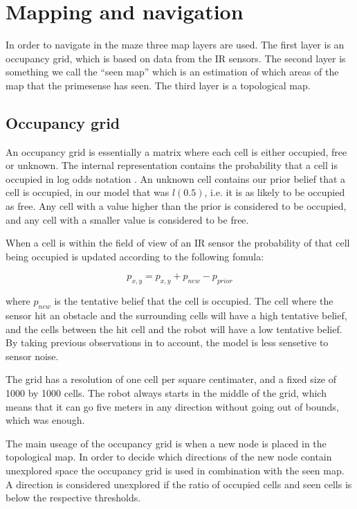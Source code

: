 \section{Mapping and navigation}
In order to navigate in the maze three map layers are used. The first layer is an occupancy grid, which is based on data from the IR sensors. The second layer is something we call the ``seen map'' which is an estimation of which areas of the map that the primesense has seen. The third layer is a topological map.

\subsection{Occupancy grid}
An occupancy grid is essentially a matrix where each cell is either occupied, free or unknown. 
The internal representation contains the probability that a cell is occupied in log odds notation \cite{wiki:Logit}.
An unknown cell contains our prior belief that a cell is occupied, in our model that was $l(0.5)$, i.e. it is as likely to be occupied as free.  
Any cell with a value higher than the prior is considered to be occupied, and any cell with a smaller value is considered to be free.

When a cell is within the field of view of an IR sensor the probability of that cell being occupied is updated according to the following fomula:

\begin{equation}
p_{x, y} = p_{x, y} + p_{new} - p_{prior}
\end{equation}

where $p_{new}$ is the tentative belief that the cell is occupied. The cell where the sensor hit an obstacle and the surrounding cells will have a high tentative belief, and the cells between the hit cell and the robot will have a low tentative belief. By taking previous observations in to account, the model is less sensetive to sensor noise. \cite{GridLecture}

The grid has a resolution of one cell per square centimater, and a fixed size of 1000 by 1000 cells. 
The robot always starts in the middle of the grid, which means that it can go five meters in any direction without going out of bounds, which was enough.

The main useage of the occupancy grid is when a new node is placed in the topological map. 
In order to decide which directions of the new node contain unexplored space the occupancy grid is used in combination with the seen map. 
A direction is considered unexplored if the ratio of occupied cells and seen cells is below the respective thresholds.


